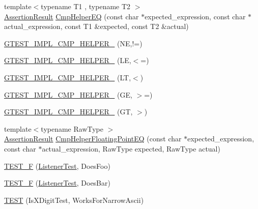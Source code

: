 \begin{DoxyCompactItemize}
\item 
{\footnotesize template$<$typename T1 , typename T2 $>$ }\\\hyperlink{classtesting_1_1_assertion_result}{Assertion\-Result} \hyperlink{namespacetesting_1_1internal_a36f7c44fad92225cbb45fde1642cf30e}{Cmp\-Helper\-E\-Q} (const char $\ast$expected\-\_\-expression, const char $\ast$actual\-\_\-expression, const T1 \&expected, const T2 \&actual)
\item 
\hyperlink{namespacetesting_1_1internal_aa3a0659f0e495c276d69bc9beddb268a}{G\-T\-E\-S\-T\-\_\-\-I\-M\-P\-L\-\_\-\-C\-M\-P\-\_\-\-H\-E\-L\-P\-E\-R\-\_\-} (N\-E,!=)
\item 
\hyperlink{namespacetesting_1_1internal_ade60646b18728043fff84d7b4125de2c}{G\-T\-E\-S\-T\-\_\-\-I\-M\-P\-L\-\_\-\-C\-M\-P\-\_\-\-H\-E\-L\-P\-E\-R\-\_\-} (L\-E,$<$=)
\item 
\hyperlink{namespacetesting_1_1internal_aabcbff15eac496f8487699d19f42c274}{G\-T\-E\-S\-T\-\_\-\-I\-M\-P\-L\-\_\-\-C\-M\-P\-\_\-\-H\-E\-L\-P\-E\-R\-\_\-} (L\-T,$<$)
\item 
\hyperlink{namespacetesting_1_1internal_af969886067930ce70f6405cd5aa8b06b}{G\-T\-E\-S\-T\-\_\-\-I\-M\-P\-L\-\_\-\-C\-M\-P\-\_\-\-H\-E\-L\-P\-E\-R\-\_\-} (G\-E, $>$=)
\item 
\hyperlink{namespacetesting_1_1internal_a7fdb4fc164db83c51dfad17640bfeae9}{G\-T\-E\-S\-T\-\_\-\-I\-M\-P\-L\-\_\-\-C\-M\-P\-\_\-\-H\-E\-L\-P\-E\-R\-\_\-} (G\-T, $>$)
\item 
{\footnotesize template$<$typename Raw\-Type $>$ }\\\hyperlink{classtesting_1_1_assertion_result}{Assertion\-Result} \hyperlink{namespacetesting_1_1internal_aaf581f35dfe9f1a3705f99b455a18abd}{Cmp\-Helper\-Floating\-Point\-E\-Q} (const char $\ast$expected\-\_\-expression, const char $\ast$actual\-\_\-expression, Raw\-Type expected, Raw\-Type actual)
\item 
\hyperlink{namespacetesting_1_1internal_a7e113e9c70d45d89fe1703e58ff083b9}{T\-E\-S\-T\-\_\-\-F} (\hyperlink{classtesting_1_1internal_1_1_listener_test}{Listener\-Test}, Does\-Foo)
\item 
\hyperlink{namespacetesting_1_1internal_a02cef32090020d164460dd3d9f8e2852}{T\-E\-S\-T\-\_\-\-F} (\hyperlink{classtesting_1_1internal_1_1_listener_test}{Listener\-Test}, Does\-Bar)
\item 
\hyperlink{namespacetesting_1_1internal_a0c1e055c001e4dbb874f00a46c25bb00}{T\-E\-S\-T} (Is\-X\-Digit\-Test, Works\-For\-Narrow\-Ascii)
\item 

\end{DoxyCompactItemize}
